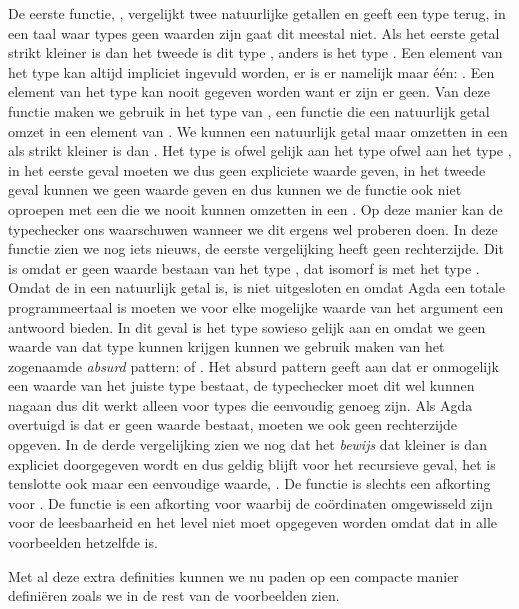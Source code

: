 De eerste functie, , vergelijkt twee natuurlijke getallen en geeft
een type terug, in een taal waar types geen waarden zijn gaat dit meestal niet.
Als het eerste getal strikt kleiner is dan het tweede is dit type ,
anders is het type . Een element van het type  kan altijd
impliciet ingevuld worden, er is er namelijk maar één: . Een element
van het type  kan nooit gegeven worden want er zijn er geen.
Van deze functie maken we gebruik in het type van , een functie
die een natuurlijk getal omzet in een element van . We kunnen een
natuurlijk getal  maar omzetten in een  als 
strikt kleiner is dan . Het type  is ofwel gelijk aan
het type  ofwel aan het type , in het eerste geval moeten we
dus geen expliciete waarde geven, in het tweede geval kunnen we geen waarde
geven en dus kunnen we de functie ook niet oproepen met een  die we
nooit kunnen omzetten in een . Op deze manier kan de typechecker
ons waarschuwen wanneer we dit ergens wel proberen doen. In deze functie zien
we nog iets nieuws, de eerste vergelijking heeft geen rechterzijde. Dit is
omdat er geen waarde bestaan van het type , dat isomorf is met het
type . Omdat de  in  een natuurlijk getal is, is
 niet uitgesloten en omdat Agda een totale programmeertaal is moeten
we voor elke mogelijke waarde van het argument  een antwoord bieden.
In dit geval is het type  sowieso gelijk aan  en omdat
we geen waarde van dat type kunnen krijgen kunnen we gebruik maken van het
zogenaamde \emph{absurd} pattern: \iagda{{}} of \iagda{()}. Het absurd pattern
geeft aan dat er onmogelijk een waarde van het juiste type bestaat, de
typechecker moet dit wel kunnen nagaan dus dit werkt alleen voor types die
eenvoudig genoeg zijn. Als Agda overtuigd is dat er geen waarde bestaat, moeten
we ook geen rechterzijde opgeven. In de derde vergelijking zien we nog dat het
\emph{bewijs} dat  kleiner is dan  expliciet doorgegeven
wordt en dus geldig blijft voor het recursieve geval, het is tenslotte ook maar
een eenvoudige waarde, . De functie  is slechts een
afkorting voor . De functie  is een afkorting voor
 waarbij de coördinaten omgewisseld zijn voor de leesbaarheid en
het level niet moet opgegeven worden omdat dat in alle voorbeelden hetzelfde
is.

Met al deze extra definities kunnen we nu paden op een compacte manier
definiëren zoals we in de rest van de voorbeelden zien.

